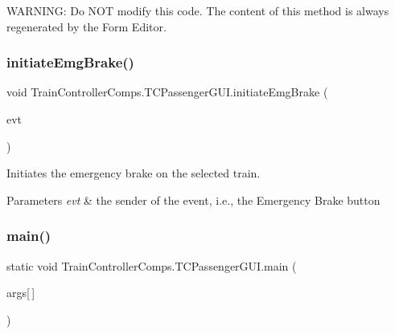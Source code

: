 W\+A\+R\+N\+I\+NG\+: Do N\+OT modify this code. The content of this method is always regenerated by the Form Editor. \mbox{\label{classTrainControllerComps_1_1TCPassengerGUI_a41e6c77f96e89bb0b247668cc426f522}} 
\subsubsection{\texorpdfstring{initiate\+Emg\+Brake()}{initiateEmgBrake()}}
{\footnotesize\ttfamily void Train\+Controller\+Comps.\+T\+C\+Passenger\+G\+U\+I.\+initiate\+Emg\+Brake (\begin{DoxyParamCaption}\item[{java.\+awt.\+event.\+Action\+Event}]{evt }\end{DoxyParamCaption})\hspace{0.3cm}{\ttfamily [private]}}



Initiates the emergency brake on the selected train. 


\begin{DoxyParams}{Parameters}
{\em evt} & the sender of the event, i.\+e., the \textquotesingle{}Emergency Brake\textquotesingle{} button \\
\hline
\end{DoxyParams}
\mbox{\label{classTrainControllerComps_1_1TCPassengerGUI_a65b80b653964f7bd6822a424c78b1a54}} 
\subsubsection{\texorpdfstring{main()}{main()}}
{\footnotesize\ttfamily static void Train\+Controller\+Comps.\+T\+C\+Passenger\+G\+U\+I.\+main (\begin{DoxyParamCaption}\item[{String}]{args\mbox{[}$\,$\mbox{]} }\end{DoxyParamCaption})\hspace{0.3cm}{\ttfamily [static]}}


